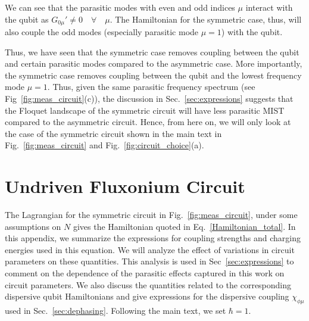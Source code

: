 \documentclass[%
reprint,
superscriptaddress,
 amsmath,amssymb,
 aps,
 prx,
longbibliography,
floatfix,
]{revtex4-2}
\begin{document}
We can see that the parasitic modes with even and odd indices $\mu$ interact with the qubit as $G_{0\mu}'\neq 0\quad \forall\quad\mu$. The Hamiltonian for the symmetric case, thus, will also couple the odd modes (especially  parasitic mode $\mu=1$) with the qubit. 

Thus, we have seen that the symmetric case removes coupling between the qubit and certain parasitic modes compared to the asymmetric case. More importantly, the symmetric case removes coupling between the qubit and the lowest frequency mode $\mu=1$. Thus, given the same parasitic frequency spectrum (see Fig~\ref{fig:meas_circuit}(c)), the discussion in Sec.~\ref{sec:expressions} suggests that the Floquet landscape of the symmetric circuit will have less parasitic MIST compared to the asymmetric circuit. Hence, from here on, we will only look at the case of the symmetric circuit shown in the main text in Fig.~\ref{fig:meas_circuit} and Fig.~\ref{fig:circuit_choice}(a).

\section{Undriven Fluxonium Circuit}\label{app:Hamiltonian}
The Lagrangian for the symmetric circuit in Fig.~\ref{fig:meas_circuit}, under some assumptions on $N$ gives the Hamiltonian quoted in Eq.~\ref{Hamiltonian_total}. In this appendix, we summarize the expressions for coupling strengths and charging energies used in this equation. We will analyze the effect of variations in circuit parameters on these quantities. This analysis is used in Sec~\ref{sec:expressions} to comment on the dependence of the parasitic effects captured in this work on circuit parameters. We also discuss the quantities related to the corresponding dispersive qubit Hamiltonians and give expressions for the dispersive coupling $\chi_{\phi\mu}$ used in Sec.~\ref{sec:dephasing}. Following the main text, we set $\hbar=1$. 
\end{document}
